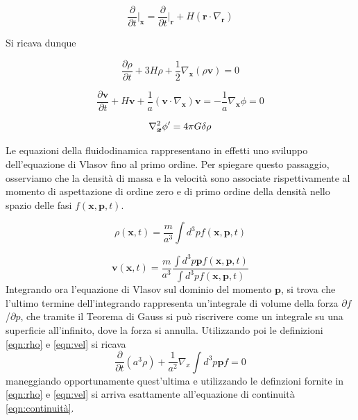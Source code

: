 \begin{equation}
    \frac{\partial}{\partial t}\biggr|_{\bm{x}} = \frac{\partial}{\partial t}\biggr|_{\bm{r}} + H(\bm{r} \cdot \nabla_{\bm{r}})
\end{equation}

Si ricava dunque

\begin{equation}
    \label{eqn:continuitax}
    \frac{\partial\rho}{\partial t} + 3H\rho +\frac{1}{2}\nabla_{\bm{x}}(\rho\bm{v}) = 0
\end{equation}

\begin{equation}
    \label{eqn:eulerox}
    \frac{\partial \bm{v}}{\partial t} + H \bm{v} + \frac{1}{a}(\bm{v}\cdot\nabla_{\bm{x}})\bm{v} = -\frac{1}{a}\nabla_{\bm{x}}\phi = 0
\end{equation}

\begin{equation}
    \label{eqn:poissonx}
    \laplacian_{\bm{x}}\phi{'} = 4\pi G \delta\rho
\end{equation}

Le equazioni della fluidodinamica rappresentano in effetti uno sviluppo dell'equazione 
di Vlasov fino al primo ordine. Per spiegare questo passaggio, osserviamo che la densità
di massa e la velocità sono associate rispettivamente al momento di aspettazione di ordine 
zero e di primo ordine della densità nello spazio delle fasi $f(\bm{x}, \bm{p}, t)$.

\begin{equation}
    \label{eqn:rho}
    \rho(\bm{x}, t) = \frac{m}{a^3}\int d^3p f(\bm{x}, \bm{p}, t)
\end{equation}

\begin{equation}
    \label{eqn:vel}
    \bm{v}(\bm{x}, t) = \frac{m}{a^3}\frac{\int d^3p \bm{p}f(\bm{x}, \bm{p}, t)}{\int d^3p f(\bm{x}, \bm{p}, t)}
\end{equation}
Integrando ora l'equazione di Vlasov sul dominio del momento $\bm{p}$, si trova che l'ultimo termine
dell'integrando rappresenta un'integrale di volume della forza $\partial f$/$\partial p$, che tramite
il Teorema di Gauss si può riscrivere come un integrale su una superficie all'infinito, dove la forza
si annulla. Utilizzando poi le definizioni \ref{eqn:rho} e \ref{eqn:vel} si ricava 
\begin{equation}
    \frac{\partial}{\partial t}(a^3 \rho) + \frac{1}{a^2}\nabla_x \int d^3 p \bm{p} f = 0
\end{equation}
maneggiando opportunamente quest'ultima e utilizzando le definzioni fornite in \ref{eqn:rho} e \ref{eqn:vel}
si arriva esattamente all'equazione di continuità \ref{eqn:continuità}.


